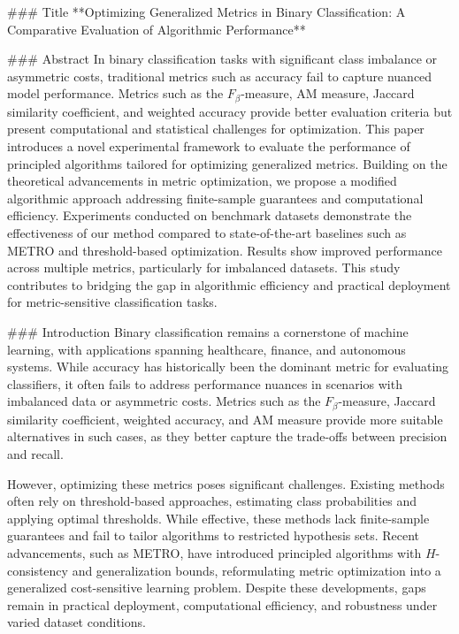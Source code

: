 ### Title  
**Optimizing Generalized Metrics in Binary Classification: A Comparative Evaluation of Algorithmic Performance**

### Abstract  
In binary classification tasks with significant class imbalance or asymmetric costs, traditional metrics such as accuracy fail to capture nuanced model performance. Metrics such as the \(F_\beta\)-measure, AM measure, Jaccard similarity coefficient, and weighted accuracy provide better evaluation criteria but present computational and statistical challenges for optimization. This paper introduces a novel experimental framework to evaluate the performance of principled algorithms tailored for optimizing generalized metrics. Building on the theoretical advancements in metric optimization, we propose a modified algorithmic approach addressing finite-sample guarantees and computational efficiency. Experiments conducted on benchmark datasets demonstrate the effectiveness of our method compared to state-of-the-art baselines such as METRO and threshold-based optimization. Results show improved performance across multiple metrics, particularly for imbalanced datasets. This study contributes to bridging the gap in algorithmic efficiency and practical deployment for metric-sensitive classification tasks.

### Introduction  
Binary classification remains a cornerstone of machine learning, with applications spanning healthcare, finance, and autonomous systems. While accuracy has historically been the dominant metric for evaluating classifiers, it often fails to address performance nuances in scenarios with imbalanced data or asymmetric costs. Metrics such as the \(F_\beta\)-measure, Jaccard similarity coefficient, weighted accuracy, and AM measure provide more suitable alternatives in such cases, as they better capture the trade-offs between precision and recall.

However, optimizing these metrics poses significant challenges. Existing methods often rely on threshold-based approaches, estimating class probabilities and applying optimal thresholds. While effective, these methods lack finite-sample guarantees and fail to tailor algorithms to restricted hypothesis sets. Recent advancements, such as METRO, have introduced principled algorithms with \(H\)-consistency and generalization bounds, reformulating metric optimization into a generalized cost-sensitive learning problem. Despite these developments, gaps remain in practical deployment, computational efficiency, and robustness under varied dataset conditions.

